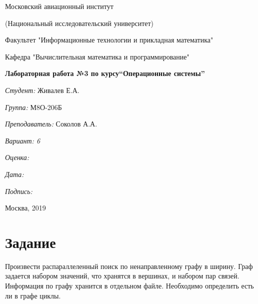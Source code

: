\documentclass[a4paper, 12pt]{article}
\begin{document}
\thispagestyle{empty}	
\begin{center}
	Московский авиационный институт
	
	(Национальный исследовательский университет)
	
	Факультет "Информационные технологии и прикладная математика"
	
	Кафедра "Вычислительная математика и программирование"
	
\end{center}
\vspace{40ex}
\begin{center}
	\textbf{\large{Лабораторная работа №3 по курсу\linebreak \textquotedblleft Операционные системы\textquotedblright}}
\end{center}
\vspace{35ex}
\begin{flushright}
	\textit{Студент: } Живалев Е.А.
	
	\vspace{2ex}
	\textit{Группа: } М8О-206Б
	
	\vspace{2ex}
	\textit{Преподаватель: } Соколов А.А.
	
	\vspace{2ex}
	\textit{Вариант: 6} 
	
	\vspace{2ex}
	\textit{Оценка: } \underline{\quad\quad\quad\quad\quad\quad}
	
	 \vspace{2ex}
	\textit{Дата: } \underline{\quad\quad\quad\quad\quad\quad}
	
	\vspace{2ex}
	\textit{Подпись: } \underline{\quad\quad\quad\quad\quad\quad}
	
\end{flushright}

\vspace{5ex}

\begin{vfill}
	\begin{center}
		Москва, 2019
	\end{center}	
\end{vfill}
\newpage

\section{Задание}

Произвести распараллеленный поиск по ненаправленному графу в ширину. Граф задается
набором значений, что хранятся в вершинах, и набором пар связей. Информация по графу
хранится в отдельном файле. Необходимо определить есть ли в графе циклы.
\end{document}
